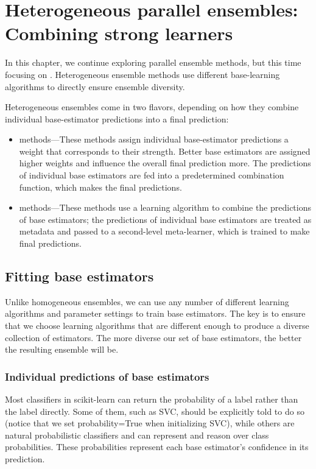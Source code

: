 \chapter{Heterogeneous parallel ensembles: Combining strong learners\label{Ch03}}
In this chapter, we continue exploring parallel ensemble methods, but this time
focusing on . Heterogeneous ensemble methods use different
base-learning algorithms to directly ensure ensemble diversity.

Heterogeneous ensembles come in two
flavors, depending on how they combine individual base-estimator predictions into a
final prediction:
\begin{itemize}
    \item  {} methods—These methods assign individual base-estimator predictions
          a weight that corresponds to their strength. Better base estimators are assigned
          higher weights and influence the overall final prediction more. The predictions of individual base estimators are fed into a predetermined combination function, which makes the final predictions.
    \item {} methods—These methods use a learning algorithm to combine the
          predictions of base estimators; the predictions of individual base estimators are
          treated as metadata and passed to a second-level meta-learner, which is trained
          to make final predictions.
\end{itemize}

\section{Fitting base estimators}
Unlike homogeneous ensembles, we can use any number of different learning algorithms and parameter settings to train base estimators. The key is to ensure that we choose learning algorithms that are
different enough to produce a diverse collection of estimators. The more diverse our
set of base estimators, the better the resulting ensemble will be.

\subsection{Individual predictions of base estimators}
\begin{tcolorbox}[title=Note]
    Most classifiers in scikit-learn can return the probability of a label rather than the
    label directly. Some of them, such as SVC, should be explicitly told to do so (notice
    that we set probability=True when initializing SVC), while others are natural
    probabilistic classifiers and can represent and reason over class probabilities. These
    probabilities represent each base estimator’s confidence in its prediction.
\end{tcolorbox}

